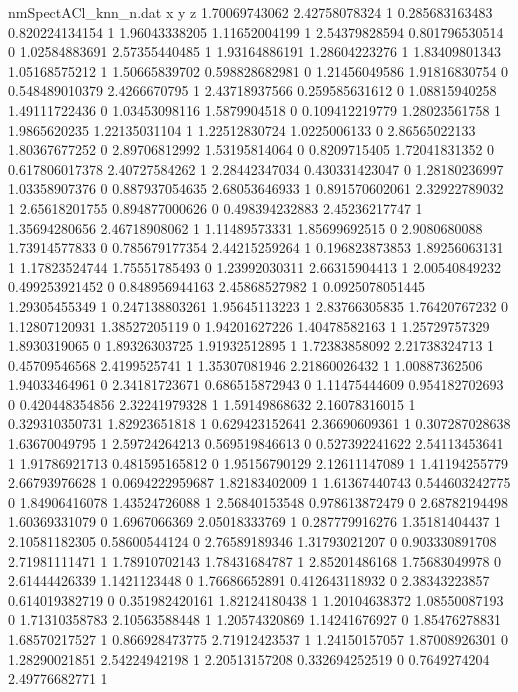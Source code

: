 \begin{filecontents}{nmSpectACl_knn_n.dat}
x y z
1.70069743062 2.42758078324 1
0.285683163483 0.820224134154 1
1.96043338205 1.11652004199 1
2.54379828594 0.801796530514 0
1.02584883691 2.57355440485 1
1.93164886191 1.28604223276 1
1.83409801343 1.05168575212 1
1.50665839702 0.598828682981 0
1.21456049586 1.91816830754 0
0.548489010379 2.4266670795 1
2.43718937566 0.259585631612 0
1.08815940258 1.49111722436 0
1.03453098116 1.5879904518 0
0.109412219779 1.28023561758 1
1.9865620235 1.22135031104 1
1.22512830724 1.0225006133 0
2.86565022133 1.80367677252 0
2.89706812992 1.53195814064 0
0.8209715405 1.72041831352 0
0.617806017378 2.40727584262 1
2.28442347034 0.430331423047 0
1.28180236997 1.03358907376 0
0.887937054635 2.68053646933 1
0.891570602061 2.32922789032 1
2.65618201755 0.894877000626 0
0.498394232883 2.45236217747 1
1.35694280656 2.46718908062 1
1.11489573331 1.85699692515 0
2.9080680088 1.73914577833 0
0.785679177354 2.44215259264 1
0.196823873853 1.89256063131 1
1.17823524744 1.75551785493 0
1.23992030311 2.66315904413 1
2.00540849232 0.499253921452 0
0.848956944163 2.45868527982 1
0.0925078051445 1.29305455349 1
0.247138803261 1.95645113223 1
2.83766305835 1.76420767232 0
1.12807120931 1.38527205119 0
1.94201627226 1.40478582163 1
1.25729757329 1.8930319065 0
1.89326303725 1.91932512895 1
1.72383858092 2.21738324713 1
0.45709546568 2.4199525741 1
1.35307081946 2.21860026432 1
1.00887362506 1.94033464961 0
2.34181723671 0.686515872943 0
1.11475444609 0.954182702693 0
0.420448354856 2.32241979328 1
1.59149868632 2.16078316015 1
0.329310350731 1.82923651818 1
0.629423152641 2.36690609361 1
0.307287028638 1.63670049795 1
2.59724264213 0.569519846613 0
0.527392241622 2.54113453641 1
1.91786921713 0.481595165812 0
1.95156790129 2.12611147089 1
1.41194255779 2.66793976628 1
0.0694222959687 1.82183402009 1
1.61367440743 0.544603242775 0
1.84906416078 1.43524726088 1
2.56840153548 0.978613872479 0
2.68782194498 1.60369331079 0
1.6967066369 2.05018333769 1
0.287779916276 1.35181404437 1
2.10581182305 0.58600544124 0
2.76589189346 1.31793021207 0
0.903330891708 2.71981111471 1
1.78910702143 1.78431684787 1
2.85201486168 1.75683049978 0
2.61444426339 1.1421123448 0
1.76686652891 0.412643118932 0
2.38343223857 0.614019382719 0
0.351982420161 1.82124180438 1
1.20104638372 1.08550087193 0
1.71310358783 2.10563588448 1
1.20574320869 1.14241676927 0
1.85476278831 1.68570217527 1
0.866928473775 2.71912423537 1
1.24150157057 1.87008926301 0
1.28290021851 2.54224942198 1
2.20513157208 0.332694252519 0
0.7649274204 2.49776682771 1

\end{filecontents}
